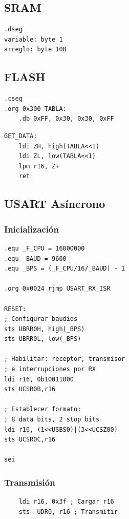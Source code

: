 \subsection{SRAM}\label{anexo:SRAM}

\begin{verbatim}
.dseg
variable: byte 1  
arreglo: byte 100
\end{verbatim}


\subsection{FLASH}\label{anexo:FLASH}

\begin{verbatim}
.cseg
.org 0x300 TABLA:
    .db 0xFF, 0x30, 0x30, 0xFF
\end{verbatim}

\begin{verbatim}
GET_DATA:
    ldi ZH, high(TABLA<<1)
    ldi ZL, low(TABLA<<1)
    lpm r16, Z+
    ret
\end{verbatim}


\subsection{USART Asíncrono}\label{anexo:USART_Asincrono}
    \subsubsection{Inicialización}
    \begin{verbatim}
.equ _F_CPU = 16000000
.equ _BAUD = 9600
.equ _BPS = (_F_CPU/16/_BAUD) - 1

.org 0x0024 rjmp USART_RX_ISR

RESET:
; Configurar baudios
sts UBRR0H, high(_BPS)
sts UBRR0L, low(_BPS)

; Habilitar: receptor, transmisor
; e interrupciones por RX
ldi r16, 0b10011000
sts UCSR0B,r16

; Establecer formato:
; 8 data bits, 2 stop bits
ldi r16, (1<<USBS0)|(3<<UCSZ00)
sts UCSR0C,r16

sei
    \end{verbatim}
    \subsubsection{Transmisión}
    \begin{verbatim}
    ldi r16, 0x3f ; Cargar r16 
    sts  UDR0, r16 ; Transmitir
    \end{verbatim}

